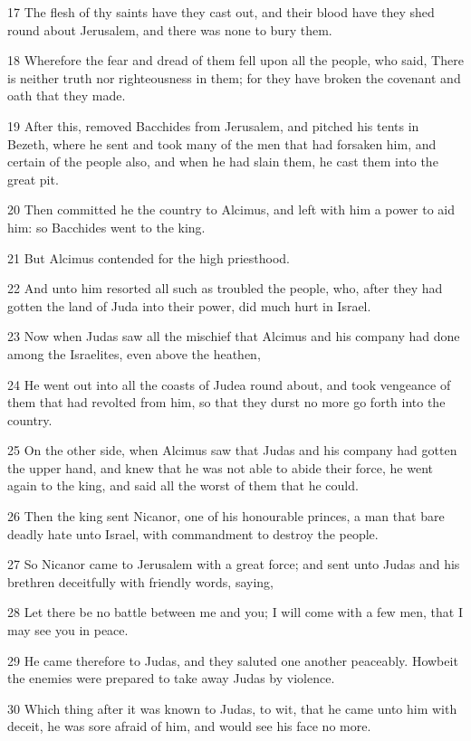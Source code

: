 \par 17 The flesh of thy saints have they cast out, and their blood have they shed round about Jerusalem, and there was none to bury them.
\par 18 Wherefore the fear and dread of them fell upon all the people, who said, There is neither truth nor righteousness in them; for they have broken the covenant and oath that they made.
\par 19 After this, removed Bacchides from Jerusalem, and pitched his tents in Bezeth, where he sent and took many of the men that had forsaken him, and certain of the people also, and when he had slain them, he cast them into the great pit.
\par 20 Then committed he the country to Alcimus, and left with him a power to aid him: so Bacchides went to the king.
\par 21 But Alcimus contended for the high priesthood.
\par 22 And unto him resorted all such as troubled the people, who, after they had gotten the land of Juda into their power, did much hurt in Israel.
\par 23 Now when Judas saw all the mischief that Alcimus and his company had done among the Israelites, even above the heathen,
\par 24 He went out into all the coasts of Judea round about, and took vengeance of them that had revolted from him, so that they durst no more go forth into the country.
\par 25 On the other side, when Alcimus saw that Judas and his company had gotten the upper hand, and knew that he was not able to abide their force, he went again to the king, and said all the worst of them that he could.
\par 26 Then the king sent Nicanor, one of his honourable princes, a man that bare deadly hate unto Israel, with commandment to destroy the people.
\par 27 So Nicanor came to Jerusalem with a great force; and sent unto Judas and his brethren deceitfully with friendly words, saying,
\par 28 Let there be no battle between me and you; I will come with a few men, that I may see you in peace.
\par 29 He came therefore to Judas, and they saluted one another peaceably. Howbeit the enemies were prepared to take away Judas by violence.
\par 30 Which thing after it was known to Judas, to wit, that he came unto him with deceit, he was sore afraid of him, and would see his face no more.
